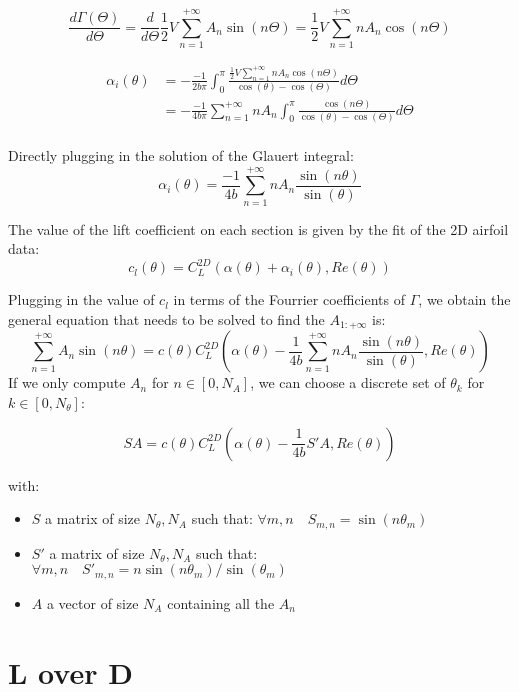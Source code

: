 \documentclass[letterpaper,12pt]{article}
\begin{document}
$$\frac{d\Gamma(\Theta)}{d\Theta} = \frac{d}{d\Theta}\frac12 V\sum_{n=1}^{+\infty} A_n \sin(n\Theta)  = \frac{1}{2} V\sum_{n=1}^{+\infty} n A_n \cos(n\Theta) $$

\begin{align*}
	\alpha_i(\theta) &= -\frac{-1}{2b\pi }  \int_{0}^{\pi} \frac{ \frac{1}{2} V\sum_{n=1}^{+\infty} n A_n \cos(n\Theta) }{\cos(\theta)-\cos(\Theta)} d\Theta	\\
				&= -\frac{-1}{4b\pi }  \sum_{n=1}^{+\infty} n A_n \int_{0}^{\pi} \frac{ \cos(n\Theta) }{\cos(\theta)-\cos(\Theta)} d\Theta	\\
\end{align*}

Directly plugging in the solution of the Glauert integral:
$$ \alpha_i(\theta) = \frac {-1}{4b}  \sum_{n=1}^{+\infty} n A_n \frac{ \sin(n\theta) }{\sin(\theta)} 	$$

The value of the lift coefficient on each section is given by the fit of the 2D airfoil data:
$$c_l(\theta) = C_L^{2D} \left( \alpha(\theta) + \alpha_i(\theta), Re(\theta)\right)$$

Plugging in the value of $c_l$ in terms of the Fourrier coefficients of $\Gamma$,
we obtain the general equation that needs to be solved to find the $A_{1:+\infty}$ is:
%
$$
\sum_{n=1}^{+\infty} A_n \sin(n\theta) = c(\theta) C_L^{2D} \left( \alpha(\theta) - \frac {1}{4b}  \sum_{n=1}^{+\infty} n A_n \frac{ \sin(n\theta) }{\sin(\theta)} , Re(\theta)\right)
$$
%
If we only compute $A_{n}$ for $n \in [0, N_A]$, we can choose a discrete set of $\theta_k$ for $k \in [0, N_{\theta}]$:

\begin{equation}
	SA = c(\theta) C_L^{2D} \left( \alpha(\theta) - \frac {1}{4b} S' A , Re(\theta)\right) 
\end{equation}

with:
\begin{itemize}
	\item[] $S$ a matrix of size $N_{\theta}, N_A$ such that: $ \forall m,n \quad S_{m,n} = \sin(n\theta_m)$ 
	\item[] $S'$ a matrix of size $N_{\theta}, N_A$ such that: $ \forall m,n \quad {S'}_{m,n} = n\sin(n\theta_m)/\sin(\theta_m)$ 
	\item[] $A$ a vector of size $N_A$ containing all the $A_n$
\end{itemize}


\section{L over D}
\end{document}
